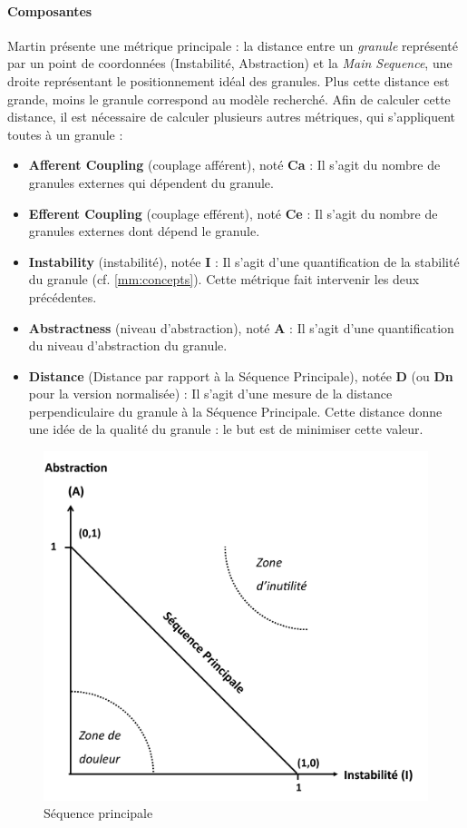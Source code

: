 \documentclass{scrartcl}
\begin{document}
    \paragraph{Composantes}Martin présente une métrique principale : la distance entre un \textit{granule} représenté par un point de coordonnées (Instabilité, Abstraction) et la \emph{Main Sequence}, une droite représentant le positionnement idéal des granules. Plus cette distance est grande, moins le granule correspond au modèle recherché. Afin de calculer cette distance, il est nécessaire de calculer plusieurs autres métriques, qui s'appliquent toutes à un granule :
    \begin{itemize}
        \item \textbf{Afferent Coupling} (couplage afférent), noté \textbf{Ca} : Il s'agit du nombre de granules externes qui dépendent du granule.
        \item \textbf{Efferent Coupling} (couplage efférent), noté \textbf{Ce} : Il s'agit du nombre de granules externes dont dépend le granule.
        \item \textbf{Instability} (instabilité), notée \textbf{I} : Il s'agit d'une quantification de la stabilité du granule (cf. \ref{mm:concepts}). Cette métrique fait intervenir les deux précédentes.
        \item \textbf{Abstractness} (niveau d'abstraction), noté \textbf{A} : Il s'agit d'une quantification du niveau d'abstraction du granule.
        \item \textbf{Distance} (Distance par rapport à la Séquence Principale), notée \textbf{D} (ou \textbf{Dn} pour la version normalisée) : Il s'agit d'une mesure de la distance perpendiculaire du granule à la Séquence Principale. Cette distance donne une idée de la qualité du granule : le but est de minimiser cette valeur.
    \end{itemize}

\begin{figure}[ht!]
    \centering
    \includegraphics[scale=0.2]{img/MainSequence.png}
    \caption{Séquence principale}
\end{figure}
\end{document}
